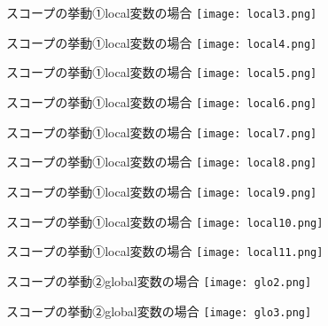 \documentclass[uplatex,dvipdfmx,ja=standard]{beamer}
\begin{document}
\begin{frame}[fragile]{スコープの挙動①local変数の場合}
    \centering 
    \texttt{[image: local3.png]}
\end{frame}


\begin{frame}[fragile]{スコープの挙動①local変数の場合}
    \centering 
    \texttt{[image: local4.png]}
\end{frame}


\begin{frame}[fragile]{スコープの挙動①local変数の場合}
    \centering 
    \texttt{[image: local5.png]}
\end{frame}

\begin{frame}[fragile]{スコープの挙動①local変数の場合}
    \centering 
    \texttt{[image: local6.png]}
\end{frame}

\begin{frame}[fragile]{スコープの挙動①local変数の場合}
    \centering 
    \texttt{[image: local7.png]}
\end{frame}

\begin{frame}[fragile]{スコープの挙動①local変数の場合}
    \centering 
    \texttt{[image: local8.png]}
\end{frame}

\begin{frame}[fragile]{スコープの挙動①local変数の場合}
    \centering 
    \texttt{[image: local9.png]}
\end{frame}

\begin{frame}[fragile]{スコープの挙動①local変数の場合}
    \centering 
    \texttt{[image: local10.png]}
\end{frame}

\begin{frame}[fragile]{スコープの挙動①local変数の場合}
    \centering 
    \texttt{[image: local11.png]}
\end{frame}


\begin{frame}[fragile]{スコープの挙動②global変数の場合}
    \centering 
    \texttt{[image: glo2.png]}
\end{frame}

\begin{frame}[fragile]{スコープの挙動②global変数の場合}
    \centering 
    \texttt{[image: glo3.png]}
\end{frame}
\end{document}
